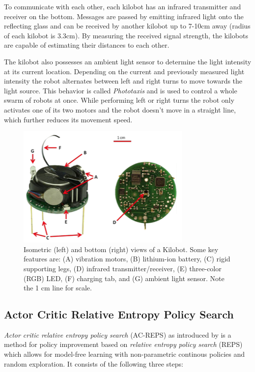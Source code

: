 \documentclass[twoside]{article}
\begin{document}
To communicate with each other, each kilobot has an infrared transmitter and
receiver on the bottom. Messages are passed by emitting infrared light onto the
reflecting glass and can be received by another kilobot up to 7-10cm away
(radius of each kilobot is 3.3cm). By measuring the received signal strength,
the kilobots are capable of estimating their distances to each other.

The kilobot also possesses an ambient light sensor to determine the light
intensity at its current location. Depending on the current and previously
measured light intensity the robot alternates between left and right turns to
move towards the light source. This behavior is called \emph{Phototaxis} and is
used to control a whole swarm of robots at once. While performing left or right
turns the robot only activates one of its two motors and the robot doesn't move
in a straight line, which further reduces its movement speed.

\begin{figure}[!htb] \centering
    \includegraphics[width=0.9\linewidth]{figures/kilobot.png}
    \caption{Isometric (left) and bottom (right) views of a Kilobot. Some key
    features are: (A) vibration motors, (B) lithium-ion battery, (C) rigid
supporting legs, (D) infrared transmitter/receiver, (E) three-color (RGB) LED,
(F) charging tab, and (G) ambient light sensor. Note the 1 cm line for
scale.\cite{kilobot}} \end{figure}

\subsection{Actor Critic Relative Entropy Policy Search}
\emph{Actor critic relative entropy policy search} (AC-REPS) as introduced by
\cite{acreps} is a method for policy improvement based on \emph{relative entropy
policy search} (REPS) \cite{reps} which allows for model-free learning with
non-parametric continous policies and random exploration. It consists of the
following three steps:
\end{document}
